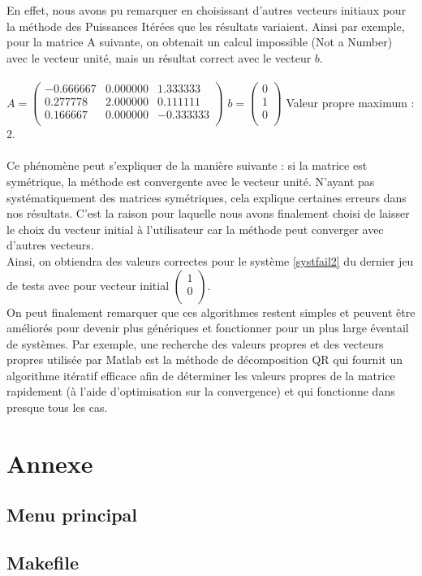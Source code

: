 \documentclass{report}
\begin{document}
    En effet, nous avons pu remarquer en choisissant d'autres vecteurs initiaux pour la méthode des Puissances Itérées que les résultats variaient. Ainsi par exemple, pour la matrice A suivante, on obtenait un calcul impossible (Not a Number) avec le vecteur unité, mais un résultat correct avec le vecteur $b$.\\ \\
    \indent
    $A = \begin{pmatrix}
      -0.666667 & 0.000000 & 1.333333 \\ 
      0.277778 & 2.000000 & 0.111111 \\ 
      0.166667 & 0.000000 & -0.333333 \\
    \end{pmatrix}$
    \indent
    $b=\begin{pmatrix}
      0 \\ 
      1 \\ 
      0 \\
    \end{pmatrix}$
    \indent
    Valeur propre maximum : $2$.\\
    \\
    Ce phénomène peut s'expliquer de la manière suivante : si la matrice est symétrique, la méthode est convergente avec le vecteur unité. N'ayant pas systématiquement des matrices symétriques, cela explique certaines erreurs dans nos résultats. C'est la raison pour laquelle nous avons finalement choisi de laisser le choix du vecteur initial à l'utilisateur car la méthode peut converger avec d'autres vecteurs.
    \\
    
    Ainsi, on obtiendra des valeurs correctes pour le système \eqref{systfail2} du dernier jeu de tests avec pour vecteur initial  $\begin{pmatrix}
      1 \\ 
      0 \\
    \end{pmatrix}$.\\
    
    On peut finalement remarquer que ces algorithmes restent simples et peuvent être améliorés pour devenir plus génériques et fonctionner pour un plus large éventail de systèmes. Par exemple, une recherche des valeurs propres et des vecteurs propres utilisée par Matlab est la méthode de décomposition QR qui fournit un algorithme itératif efficace afin de déterminer les valeurs propres de la matrice rapidement (à l'aide d'optimisation sur la convergence) et qui fonctionne dans presque tous les cas.
    
  \chapter{Annexe}
    \section{Menu principal}
      
    \section{Makefile}
      
\end{document}
